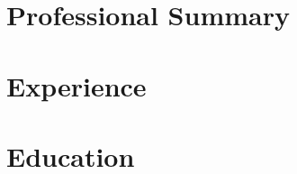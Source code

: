 \documentclass{article}
\begin{document}
\section*{Professional Summary}

\section*{Experience}

\section*{Education}

\end{document}
